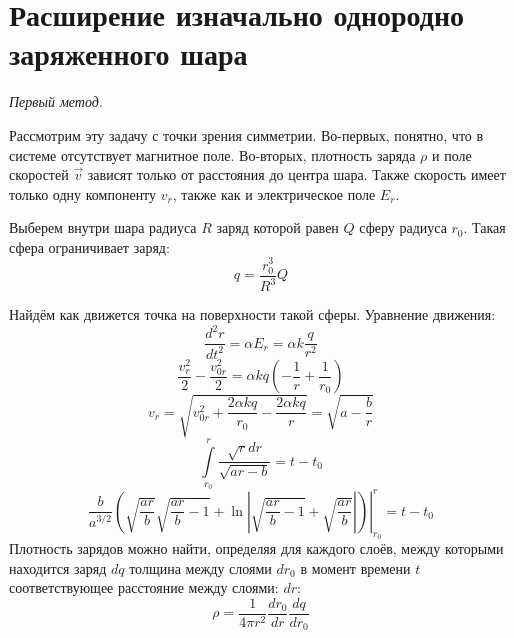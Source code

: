 \section{Расширение изначально однородно заряженного шара}

\textit{Первый метод}. 

Рассмотрим эту задачу с точки зрения симметрии. Во-первых, понятно, что в системе отсутствует магнитное поле. Во-вторых, плотность заряда $\rho$ и поле скоростей $\vec{v}$ зависят только от расстояния до центра шара. Также скорость имеет только одну компоненту $v_r$, также как и электрическое поле $E_r$.
 
Выберем внутри шара радиуса $R$ заряд которой равен $Q$ сферу радиуса $r_0$. Такая сфера ограничивает заряд:
\[
	q = \frac{r_0^3}{R^3} Q
\]

Найдём как движется точка на поверхности такой сферы. Уравнение движения:
\[
	\frac{d^2 r}{dt^2} = \alpha E_r = \alpha  k \frac{q}{r^2}
\]
\[
	\frac{v_r^2}{2} - \frac{v_{0r}^2}{2} = \alpha k q \left(- \frac{1}{r} + \frac{1}{r_0}\right)
\]
\[
	v_r = \sqrt{v_{0r}^2 + \frac{2\alpha kq}{r_0} - \frac{2\alpha k q}{r}} = \sqrt{a - \frac{b}{r}}
\]
\[
	\int\limits_{r_0}^{r} 
	\frac{\sqrt{r} dr}{\sqrt{ar - b}}
	=
	t - t_0
\]
\[
	\frac{b}{a^{3/2}} 
	\left.
	\left(\sqrt{\frac{ar}{b}} \sqrt{\frac{ar}{b}-1} + 
	\ln \left|\sqrt{\frac{ar}{b} - 1} + \sqrt{\frac{ar}{b}}\right|\right) 
	\right|_{r_0}^{r}
	= t - t_0
\]
Плотность зарядов можно найти, определяя для каждого слоёв, между которыми находится заряд $dq$ толщина между слоями $dr_0$ в момент времени $t$ соответствующее расстояние между слоями:
$dr$:
\[
	\rho = \frac{1}{4\pi r^2}\frac{dr_0}{dr}\frac{dq}{dr_0}
\]